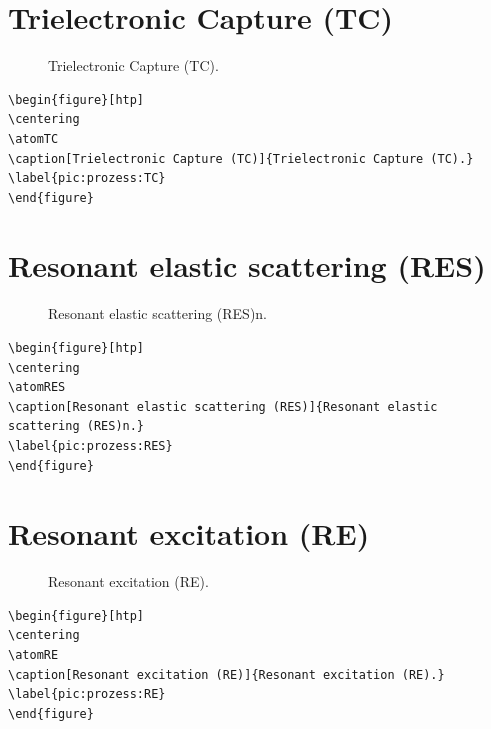 \documentclass[
	a4paper,
	parskip=half,
    pagesize=auto,      		%
    listof=totoc,   		%
    bibliography=totoc,
	11pt
]{scrartcl}
\begin{document}
\section{Trielectronic Capture (TC)}

\begin{figure}[htp]
\centering
\atomTC
\caption[Trielectronic Capture (TC)]{Trielectronic Capture (TC).}
\label{pic:prozess:TRS}
\end{figure}

\begin{lstlisting}
\begin{figure}[htp]
\centering
\atomTC
\caption[Trielectronic Capture (TC)]{Trielectronic Capture (TC).}
\label{pic:prozess:TC}
\end{figure}
\end{lstlisting}


\section{Resonant elastic scattering (RES)}

\begin{figure}[htp]
\centering
\atomRES
\caption[Resonant elastic scattering (RES)]{Resonant elastic scattering (RES)n.}
\label{pic:prozess:RES}
\end{figure}

\begin{lstlisting}
\begin{figure}[htp]
\centering
\atomRES
\caption[Resonant elastic scattering (RES)]{Resonant elastic scattering (RES)n.}
\label{pic:prozess:RES}
\end{figure}
\end{lstlisting}

\section{Resonant excitation (RE)}

\begin{figure}[htp]
\centering
\atomRE
\caption[Resonant excitation (RE)]{Resonant excitation (RE).}
\label{pic:prozess:RE}
\end{figure}

\begin{lstlisting}
\begin{figure}[htp]
\centering
\atomRE
\caption[Resonant excitation (RE)]{Resonant excitation (RE).}
\label{pic:prozess:RE}
\end{figure}
\end{lstlisting}
\end{document}
